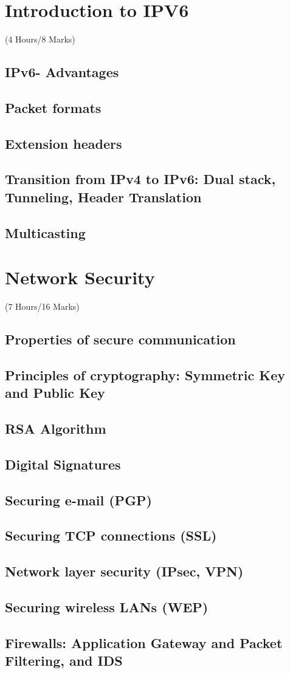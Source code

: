 \documentclass[12pt]{article}
\begin{document}
\section{Introduction to IPV6}
	\begin{center}(4 Hours/8 Marks)\end{center}
	\subsection{IPv6- Advantages}
	\subsection{Packet formats}
	\subsection{Extension headers}
	\subsection{Transition from IPv4 to IPv6: Dual stack, Tunneling, Header Translation}
	\subsection{Multicasting}

	\pagebreak

\section{Network Security}
	\begin{center}(7 Hours/16 Marks)\end{center}
	\subsection{Properties of secure communication}
	\subsection{Principles of cryptography: Symmetric Key and Public Key}
	\subsection{RSA Algorithm}
	\subsection{Digital Signatures}
	\subsection{Securing e-mail (PGP)}
	\subsection{Securing TCP connections (SSL)}
	\subsection{Network layer security (IPsec, VPN)}
	\subsection{Securing wireless LANs (WEP)}
	\subsection{Firewalls: Application Gateway and Packet Filtering, and IDS}
\end{document}
